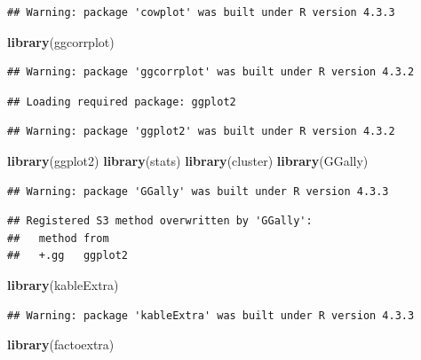 \documentclass[
]{article}
\newenvironment{Shaded}{\begin{snugshade}}{\end{snugshade}}
\newcommand{\FunctionTok}[1]{\textcolor[rgb]{0.13,0.29,0.53}{\textbf{#1}}}
\newcommand{\NormalTok}[1]{#1}
\begin{document}
\begin{verbatim}
## Warning: package 'cowplot' was built under R version 4.3.3
\end{verbatim}

\begin{Shaded}
\begin{Highlighting}[]
\FunctionTok{library}\NormalTok{(ggcorrplot)}
\end{Highlighting}
\end{Shaded}

\begin{verbatim}
## Warning: package 'ggcorrplot' was built under R version 4.3.2
\end{verbatim}

\begin{verbatim}
## Loading required package: ggplot2
\end{verbatim}

\begin{verbatim}
## Warning: package 'ggplot2' was built under R version 4.3.2
\end{verbatim}

\begin{Shaded}
\begin{Highlighting}[]
\FunctionTok{library}\NormalTok{(ggplot2)}
\FunctionTok{library}\NormalTok{(stats)}
\FunctionTok{library}\NormalTok{(cluster)}
\FunctionTok{library}\NormalTok{(GGally)}
\end{Highlighting}
\end{Shaded}

\begin{verbatim}
## Warning: package 'GGally' was built under R version 4.3.3
\end{verbatim}

\begin{verbatim}
## Registered S3 method overwritten by 'GGally':
##   method from   
##   +.gg   ggplot2
\end{verbatim}

\begin{Shaded}
\begin{Highlighting}[]
\FunctionTok{library}\NormalTok{(kableExtra)}
\end{Highlighting}
\end{Shaded}

\begin{verbatim}
## Warning: package 'kableExtra' was built under R version 4.3.3
\end{verbatim}

\begin{Shaded}
\begin{Highlighting}[]
\FunctionTok{library}\NormalTok{(factoextra)}
\end{Highlighting}
\end{Shaded}
\end{document}
